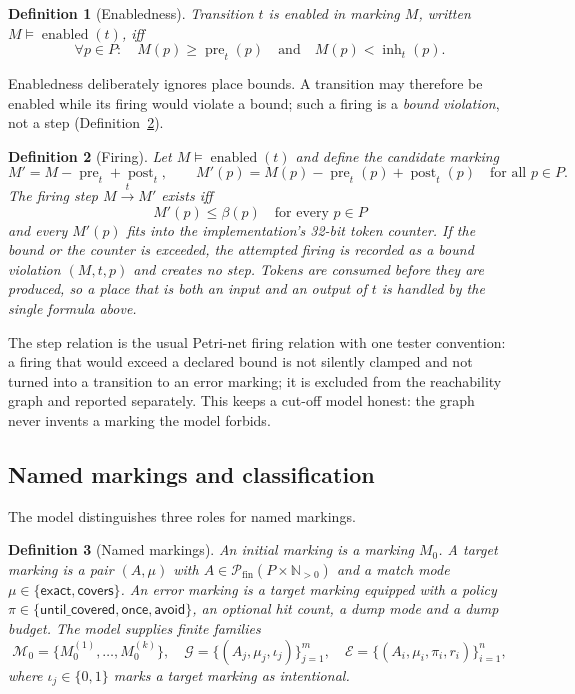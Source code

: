 \documentclass[11pt,a4paper]{article}
\newtheorem{definition}{Definition}[section]
\newcommand{\Npos}{\mathbb{N}_{>0}}
\newcommand{\Pow}{\mathcal{P}}
\newcommand{\pre}{\operatorname{pre}}
\newcommand{\post}{\operatorname{post}}
\newcommand{\inh}{\operatorname{inh}}
\newcommand{\Enabled}{\operatorname{enabled}}
\newcommand{\fir}[1]{\xrightarrow{#1}}
\newcommand{\bool}{\{0,1\}}
\begin{document}
\begin{definition}[Enabledness]\label{def:enabled}
Transition $t$ is \emph{enabled} in marking $M$, written $M\models
\Enabled(t)$, iff
\[
  \forall p\in P:\quad
  M(p)\ge \pre_t(p)
  \quad\text{and}\quad
  M(p)<\inh_t(p).
\]
\end{definition}

Enabledness deliberately ignores place bounds.  A transition may therefore be
enabled while its firing would violate a bound; such a firing is a
\emph{bound violation}, not a step (Definition~\ref{def:firing}).

\begin{definition}[Firing]\label{def:firing}
Let $M\models\Enabled(t)$ and define the candidate marking
\[
  M' = M-\pre_t+\post_t,
  \qquad
  M'(p)=M(p)-\pre_t(p)+\post_t(p)\quad\text{for all }p\in P.
\]
The \emph{firing step} $M\fir{t}M'$ exists iff
\[
  M'(p)\le \beta(p)\quad\text{for every }p\in P
\]
and every $M'(p)$ fits into the implementation's 32-bit token counter.  If
the bound or the counter is exceeded, the attempted firing is recorded as a
\emph{bound violation} $(M,t,p)$ and creates no step.  Tokens are consumed
before they are produced, so a place that is both an input and an output of
$t$ is handled by the single formula above.
\end{definition}

The step relation is the usual Petri-net firing relation with one tester
convention: a firing that would exceed a declared bound is not silently
clamped and not turned into a transition to an error marking; it is excluded
from the reachability graph and reported separately.  This keeps a cut-off
model honest: the graph never invents a marking the model forbids.

\subsection{Named markings and classification}

The model distinguishes three roles for named markings.

\begin{definition}[Named markings]\label{def:named}
An \emph{initial marking} is a marking $M_0$.  A \emph{target marking} is a
pair $(A,\mu)$ with $A\in\Pow_{\mathrm{fin}}(P\times\Npos)$ and a match mode
$\mu\in\{\mathsf{exact},\mathsf{covers}\}$.  An \emph{error marking} is a
target marking equipped with a policy
$\pi\in\{\mathsf{until\_covered},\mathsf{once},\mathsf{avoid}\}$, an optional
hit count, a dump mode and a dump budget.  The model supplies finite families
\[
  \mathcal{M}_0=\{M_0^{(1)},\dots,M_0^{(k)}\},\quad
  \mathcal{G}=\{(A_j,\mu_j,\iota_j)\}_{j=1}^{m},\quad
  \mathcal{E}=\{(A_i,\mu_i,\pi_i,r_i)\}_{i=1}^{n},
\]
where $\iota_j\in\bool$ marks a target marking as \emph{intentional}.
\end{definition}
\end{document}
